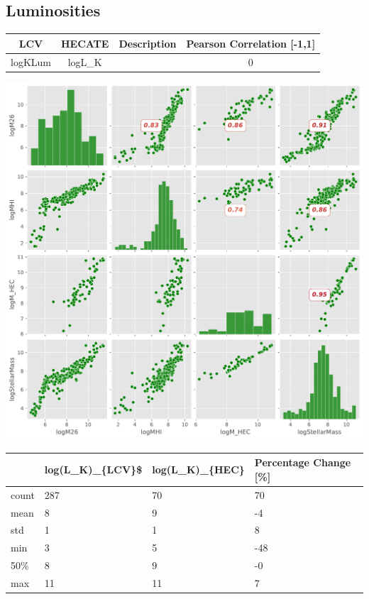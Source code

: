 \documentclass[
]{article}
\begin{document}
\subsection{Luminosities}\label{luminosities}

\begin{longtable}[]{@{}cccc@{}}
\toprule\noalign{}
LCV & HECATE & Description & Pearson Correlation {[}-1,1{]} \\
\midrule\noalign{}
\endhead
\bottomrule\noalign{}
\endlastfoot
logKLum & logL\_K & & 0 \\
\end{longtable}

\includegraphics{compare_files/figure-pdf/cell-33-output-1.pdf}

\begin{longtable}[]{@{}llll@{}}
\toprule\noalign{}
& log(L\_K)\_\{LCV\}\$ & log(L\_K)\_\{HEC\} & Percentage Change
{[}\%{]} \\
\midrule\noalign{}
\endhead
\bottomrule\noalign{}
\endlastfoot
count & 287 & 70 & 70 \\
mean & 8 & 9 & -4 \\
std & 1 & 1 & 8 \\
min & 3 & 5 & -48 \\
50\% & 8 & 9 & -0 \\
max & 11 & 11 & 7 \\
\end{longtable}
\end{document}
